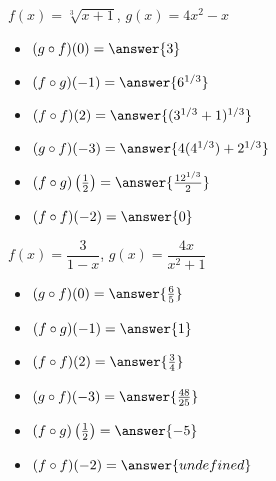 \documentclass{ximera}
\begin{document}
\begin{exercise}
 $f(x) = \sqrt[3]{x+1}$, $g(x) = 4x^2-x$
\begin{itemize}
\item  $(g\circ f)(0)=\answer{3}$
\item  $(f\circ g)(-1)=\answer{6^{1/3}}$
\item  $(f \circ f)(2)=\answer{(3^{1/3}+1)^{1/3}}$
\item  $(g\circ f)(-3)=\answer{4(4^{1/3})+2^{1/3}}$
\item  $(f\circ g)\left(\frac{1}{2}\right)=\answer{\frac{12^{1/3}}{2}}$
\item  $(f \circ f)(-2)=\answer{0}$
\end{itemize}
\end{exercise}


\begin{exercise}
$f(x) = \dfrac{3}{1-x}$, $g(x) = \dfrac{4x}{x^2+1}$
\begin{itemize}
\item  $(g\circ f)(0)=\answer{\frac{6}{5}}$
\item  $(f\circ g)(-1)=\answer{1}$
\item  $(f \circ f)(2)=\answer{\frac{3}{4}}$
\item  $(g\circ f)(-3)=\answer{\frac{48}{25}}$
\item  $(f\circ g)\left(\frac{1}{2}\right)=\answer{-5}$
\item  $(f \circ f)(-2)=\answer{undefined}$
\end{itemize}
\end{exercise}
\end{document}

